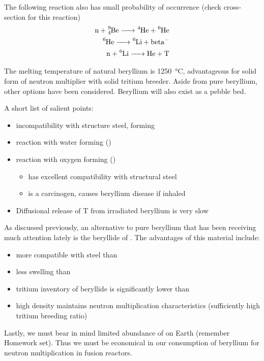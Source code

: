 \documentclass[11pt]{report} %
\begin{document}
The following reaction also has small probability of occurrence (check cross-section for this reaction)
\begin{align*}
\ce{n + ^9_4Be -> ^4He + ^6He} \\
\ce{^6He -> ^6Li + beta^-} \\
\ce{n + ^6Li -> He + T}
\end{align*}

The melting temperature of natural beryllium is \SI{1250}{\celsius}, advantageous for solid form of neutron multiplier with solid tritium breeder. Aside from pure beryllium, other options have been considered. Beryllium will also exist as a pebble bed. 

A short list of salient points:
\begin{itemize}
\item{ incompatibility with structure steel, forming }
\item{ reaction with water forming  ()}
\item{ reaction with oxygen forming  ()}
\begin{itemize}
\item{ has excellent compatibility with structural steel}
\item{ is a carcinogen, causes beryllium disease if inhaled}
\end{itemize}
\item{Diffusional release of T from irradiated beryllium is very slow}
\end{itemize}

As discussed previously, an alternative to pure beryllium that has been receiving much attention lately is the beryllide of . The advantages of this material include:\cite{Kawamura2003a}
\begin{itemize}
\item{more compatible with steel than }
\item{less swelling than }
\item{tritium inventory of beryllide is significantly lower than }
\item{high  density maintains neutron multiplication characteristics (sufficiently high tritium breeding ratio)}
\end{itemize}

Lastly, we must bear in mind limited abundance of  on Earth (remember Homework set). Thus we must be economical in our consumption of beryllium for neutron multiplication in fusion reactors.
\end{document}
